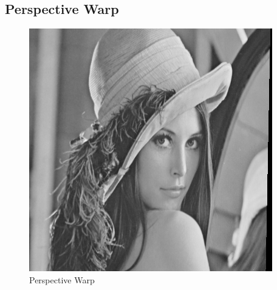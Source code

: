 \subsection{Perspective Warp} \label{subsec:perspective_warp}

\begin{figure}[H]
    \centering
    \includegraphics[scale=0.5]{images/lenna-perspective-warp.png}
    \caption{Perspective Warp}
    \label{fig:lenna-perspective-warp}
\end{figure}